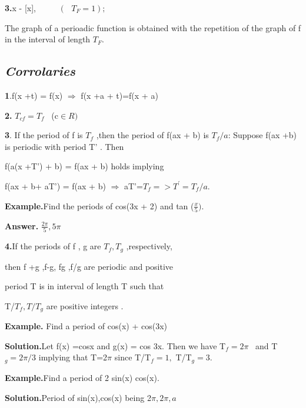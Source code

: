 \documentclass[11pt]{amsbook}
\begin{document}
\textbf{3.}x - [x], $\ \ \ \ \ \ \ \ \ \ \ (\ \ \ T_{F}=1);$

\bigskip 

The graph of a perioadic function is obtained with the repetition of the
graph of f in the interval of length $T_{F}.$

\bigskip 




\subsection{\emph{Corrolaries}}

\bigskip 

\textbf{1}.f(x +t) = f(x) $\Rightarrow$ f(x +a + t)=f(x + a)

\bigskip 

\textbf{2.} $T_{cf}=T_{f}$ \ (c$\in R)$

\bigskip 

\textbf{3}. If the period of f is $T_{f}$ ,then the period of f(ax + b) is $%
T_{f}/a$:  Suppose f(ax +b) is periodic with period T' . Then 

\bigskip 

f(a(x +T') + b) = f(ax + b) holds implying

\bigskip 

f(ax + b+ aT') = f(ax + b) $\Rightarrow$ aT'=$T_{f}=>T^{\prime }=T_{f}/a.$

\begin{flushleft}
\textbf{Example.}Find the periods of cos(3x + 2) and tan ($\frac{x}{5}).$

\bigskip 

\textbf{Answer. }$\frac{2\pi }{5},5\pi $

\bigskip 
\end{flushleft}

\textbf{4.}If the periods of f , g are $T_{f},T_{g}$ ,respectively,

\bigskip 

then f +g ,f-g, fg ,f/g are periodic and positive

\bigskip 

period T is in interval of length T such that 

\bigskip 

T/$T_{f},T/T_{g}$ are positive integers . \ 

\bigskip 

\begin{flushleft}
\textbf{Example.} Find a period of cos(x) + cos(3x)

\bigskip 

\textbf{Solution.}Let f(x) =cosx and g(x) = cos 3x. Then we have T$_{f}=2\pi 
$ \ and T$_{g}=2\pi /3$ implying that T=2$\pi $ since T/T$_{f}=1,$ T/T$%
_{g}=3.$

\bigskip 

\textbf{Example.}Find a period of 2 sin(x) cos(x).

\bigskip 

\textbf{Solution.}Period of sin(x),cos(x) being 2$\pi ,2\pi ,a$
\end{flushleft}
\end{document}
